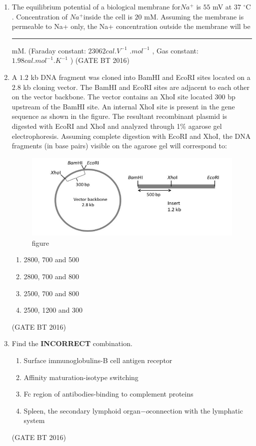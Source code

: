 \documentclass[journal,12pt,onecolumn]{IEEEtran}
\theoremstyle{remark}
\begin{document}
\begin{enumerate}
\item The equilibrium potential of a biological membrane for$ Na^{+}$ is $55$ mV at $37$ $^\circ\mathrm{C}$. Concentration of
$Na^{+}$inside the cell is $20$ mM. Assuming the membrane is permeable to Na+ only, the Na+
concentration outside the membrane will be \rule{3cm}{0.4pt} mM.
(Faraday constant: $23062 cal.V^{-1}$ .$mol^ {-1}$ , Gas constant: $1.98 cal.mol^{-1} .K^{-1}$ ) \hfill(GATE BT 2016) 

\item A $1.2$ kb DNA fragment was cloned into BamHI and EcoRI sites located on a $2.8$ kb cloning vector. The BamHI and EcoRI sites are adjacent to each other on the vector backbone. The vector contains an XhoI site located 300 bp upstream of the BamHI site. An internal XhoI site is present in the gene sequence as shown in the figure. The resultant recombinant plasmid is digested with EcoRI and XhoI and analyzed through 1\% agarose gel electrophoresis. Assuming complete digestion with EcoRI and XhoI, the DNA fragments (in base pairs) visible on the agarose gel will correspond to:

\begin{figure}[H]
    \centering
    \includegraphics[width=0.7\columnwidth]{figs_2/fig_2.36.jpeg}
    \caption{figure}
    \label{fig:figure}
\end{figure}

\begin{multicols}{2}
\begin{enumerate}
\item 2800, 700 and 500	
\item 2800, 700 and 800
\item  2500, 700 and 800	
\item  2500, 1200 and 300
\end{enumerate}
\end{multicols} \hfill(GATE BT 2016) 


\item  Find the \textbf{INCORRECT} combination.

\begin{enumerate}
\item Surface immunoglobulins-B cell antigen receptor
\item Affinity maturation-isotype switching
\item Fc region of antibodies-binding to complement proteins
\item Spleen, the secondary lymphoid organ$-o$connection with the lymphatic system
\end{enumerate} \hfill(GATE BT 2016) 



\end{enumerate}
\end{document}
